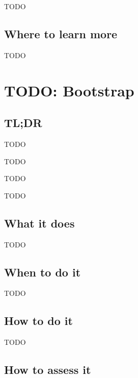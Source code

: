 \documentclass[
]{book}
\providecommand{\tightlist}{%
  \setlength{\itemsep}{0pt}\setlength{\parskip}{0pt}}
\begin{document}
TODO

\hypertarget{where-to-learn-more-9}{%
\section{Where to learn more}\label{where-to-learn-more-9}}

TODO

\hypertarget{bootstrap}{%
\chapter{TODO: Bootstrap}\label{bootstrap}}

\hypertarget{tldr-10}{%
\section{TL;DR}\label{tldr-10}}

\begin{description}
\tightlist
\item[What it does]
TODO
\item[When to do it]
TODO
\item[How to do it]
TODO
\item[How to assess it]
TODO
\end{description}

\hypertarget{what-it-does-10}{%
\section{What it does}\label{what-it-does-10}}

TODO

\hypertarget{when-to-do-it-10}{%
\section{When to do it}\label{when-to-do-it-10}}

TODO

\hypertarget{how-to-do-it-10}{%
\section{How to do it}\label{how-to-do-it-10}}

TODO

\hypertarget{how-to-assess-it-10}{%
\section{How to assess it}\label{how-to-assess-it-10}}
\end{document}
